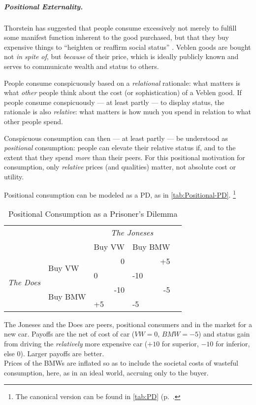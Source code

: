 \subparagraph{Positional Externality.}
	\label{sec:positional-race}
Thorstein \cite{Veblen1899} has suggested that people consume excessively not merely to fulfill some manifest function inherent to the good purchased, but that they buy expensive things to ``heighten or reaffirm social status'' \citep[123]{Merton-1968-aa}.
Veblen goods are bought not \emph{in spite of}, but \emph{because} of their price, which is ideally publicly known and serves to communicate wealth and status to others.

People consume conspicuously based on a \emph{relational} rationale:
what matters is what \emph{other} people think about the cost (or sophistication) of a Veblen good.
If people consume conspicuously --- at least partly --- to display status, the rationale is also \emph{relative}:
what matters is how much you spend in relation to what other people spend.

Conspicuous consumption can then --- at least partly --- be understood as \emph{positional} consumption:
people can elevate their relative status if, and to the extent that they spend \emph{more} than their peers.
For this positional motivation for consumption, only \emph{relative} prices (and qualities) matter, not absolute cost or utility.

Positional consumption can be modeled as a \gls{PD}, as in \autoref{tab:Positional-PD}.
\footnote{
	The canonical version can be found in \autoref{tab:PD} (p.~\pageref{tab:PD}.
}

\begin{table}
	\caption{Positional Consumption as a Prisoner's Dilemma}
	\label{tab:Positional-PD}
	\begin{center}
	\begin{tabular}{m{1cm}m{}m{}m{}m{}}
		& & \multicolumn{2}{c}{\emph{The Joneses}} \\
		& &Buy VW & Buy BMW\\
		\cline{3-4}
		\multicolumn{1}{c}{\multirow{4}{*}{\emph{The Does}}} & \multirow{2}{2,3cm}{Buy VW} & 		\multicolumn{1}{|r|}{0} & \multicolumn{1}{r|}{+5}\\
		\multicolumn{1}{c}{} & \multicolumn{1}{c}{}& \multicolumn{1}{|l|}{0} & \multicolumn{1}{l|}{-10}\\
		\cline{3-4}
		\multicolumn{1}{c}{} & \multirow{2}{2,3cm}{Buy BMW} & \multicolumn{1}{|r|}{-10} & \multicolumn{1}{r|}{-5}\\
		\multicolumn{1}{c}{} & \multicolumn{1}{c}{}& \multicolumn{1}{|l|}{+5} & \multicolumn{1}{l|}{-5}\\
		\cline{3-4}
	\end{tabular}
	\end{center}
	\scriptsize{The Joneses and the Does are peers, positional consumers and in the market for a new car.
Payoffs are the net of cost of car ($VW=0$, $BMW=-5$) and status gain from driving the \emph{relatively} more expensive car ($+10$ for superior, $-10$ for inferior, else $0$).
Larger payoffs are better.\\
	Prices of the BMWs are inflated so as to include the societal costs of wasteful consumption, here, as in an ideal world, accruing only to the buyer.}
\end{table}

